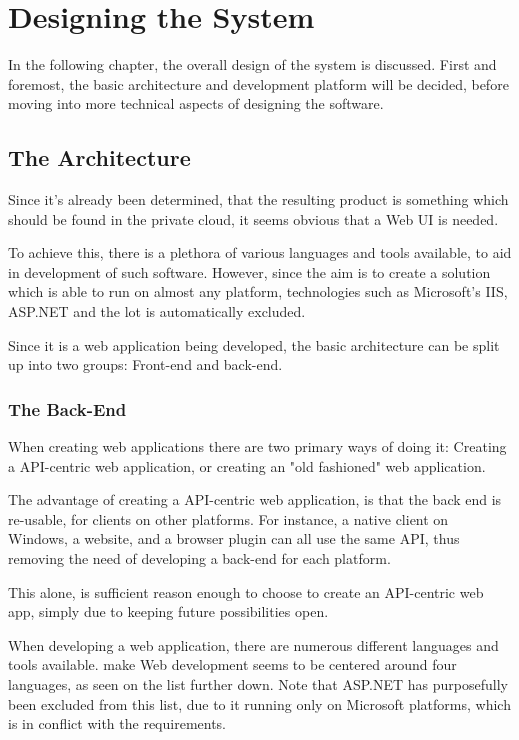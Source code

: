 \chapter{Designing the System}
	In the following chapter, the overall design of the system is discussed. First and foremost, the basic architecture and development platform will be decided, before moving into more technical aspects of designing the software.


	\section{The Architecture}
		Since it's already been determined, that the resulting product is something which should be found in the private cloud, it seems obvious that a Web UI is needed.

		To achieve this, there is a plethora of various languages and tools available, to aid in development of such software. However, since the aim is to create a solution which is able to run on almost any platform, technologies such as Microsoft's IIS, ASP.NET and the lot is automatically excluded.



		Since it is a web application being developed, the basic architecture can be split up into two groups: Front-end and back-end.

		\subsection{The Back-End}
			When creating web applications there are two primary ways of doing it: Creating a API-centric web application, or creating an "old fashioned" web application.

			The advantage of creating a API-centric web application, is that the back end is re-usable, for clients on other platforms. For instance, a native client on Windows, a website, and a browser plugin can all use the same API, thus removing the need of developing a back-end for each platform.

			This alone, is sufficient reason enough to choose to create an API-centric web app, simply due to keeping future possibilities open.

			When developing a web application, there are numerous different languages and tools available. make
			Web development seems to be centered around four languages, as seen on the list further down. Note that ASP.NET has purposefully been excluded from this list, due to it running only on Microsoft platforms, which is in conflict with the requirements.
			
